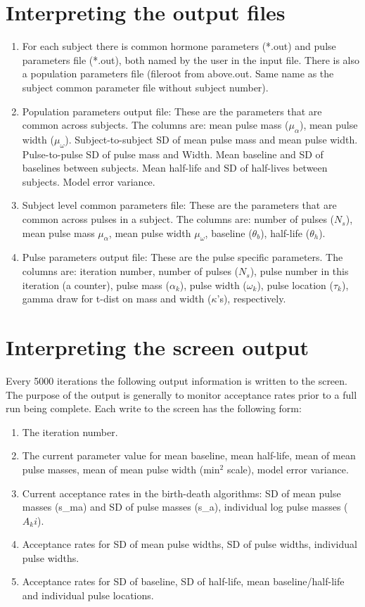 \documentclass[12pt, oneside]{article}   	%
\begin{document}
\section{Interpreting the output files}
\begin{enumerate}
\item For each subject there is common hormone parameters (*.out) and pulse parameters file (*.out), both named by the user in the input file. There is also a population parameters file (fileroot from above.out. Same name as the subject common parameter file without subject number).
\item Population parameters output file: These are the parameters that are common across subjects.  The columns are: mean  pulse mass ($\mu_\alpha$), mean  pulse width ($\mu_\omega$). Subject-to-subject SD of mean  pulse mass and mean  pulse width. Pulse-to-pulse SD of pulse mass and Width. Mean baseline and SD of baselines between subjects. Mean half-life and SD of half-lives between subjects. Model error variance.
\item Subject level common parameters file: These are the parameters that are common across pulses in a subject. The columns are: number of pulses ($N_s$), mean  pulse mass $\mu_{\alpha}$, mean  pulse width $\mu_{\omega}$, baseline ($\theta_b$), half-life ($\theta_h$).
\item Pulse parameters output file: These are the pulse specific parameters. The columns are:  iteration number, number of pulses ($N_s$), pulse number in this iteration (a counter), pulse mass ($\alpha_k$), pulse width ($\omega_k$), pulse location ($\tau_k$), gamma draw for t-dist on mass and width ($\kappa$'s), respectively.
\end{enumerate}

\section{Interpreting the screen output}
Every 5000 iterations the following output information is written to the screen. The purpose of the output is generally to monitor acceptance rates prior to a full run being complete.  Each write to the screen has the following form:
\begin{enumerate}
\item The iteration number.
\item The current parameter value for mean baseline, mean half-life, mean of mean  pulse masses, mean of mean  pulse width (min$^2$ scale),  model error variance.
\item Current acceptance rates in the birth-death algorithms: SD of mean  pulse masses (s\_ma) and SD of  pulse masses (s\_a), individual log pulse masses ($A_ki$).
\item Acceptance rates for SD of mean  pulse widths, SD of  pulse widths, individual  pulse widths.
\item Acceptance rates for SD of baseline, SD of half-life, mean baseline/half-life and individual pulse locations.
\end{enumerate}
\end{document}
